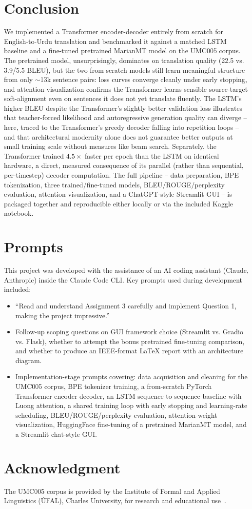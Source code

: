 \documentclass[conference]{IEEEtran}
\begin{document}
\section{Conclusion}
We implemented a Transformer encoder-decoder entirely from scratch for
English-to-Urdu translation and benchmarked it against a matched LSTM
baseline and a fine-tuned pretrained MarianMT model on the UMC005 corpus.
The pretrained model, unsurprisingly, dominates on translation quality
(22.5 vs. 3.9/5.5 BLEU), but the two from-scratch models still learn
meaningful structure from only $\sim$13k sentence pairs: loss curves
converge cleanly under early stopping, and attention visualization confirms
the Transformer learns sensible source-target soft-alignment even on
sentences it does not yet translate fluently. The LSTM's higher BLEU
despite the Transformer's slightly better validation loss illustrates that
teacher-forced likelihood and autoregressive generation quality can
diverge -- here, traced to the Transformer's greedy decoder falling into
repetition loops -- and that architectural modernity alone does not
guarantee better outputs at small training scale without measures like beam
search. Separately, the Transformer trained $4.5\times$ faster per epoch
than the LSTM on identical hardware, a direct, measured consequence of its
parallel (rather than sequential, per-timestep) decoder computation. The
full pipeline -- data preparation, BPE tokenization, three trained/fine-tuned
models, BLEU/ROUGE/perplexity evaluation, attention visualization, and a
ChatGPT-style Streamlit GUI -- is packaged together and reproducible either
locally or via the included Kaggle notebook.

\section{Prompts}
This project was developed with the assistance of an AI coding assistant
(Claude, Anthropic) inside the Claude Code CLI. Key prompts used during
development included:
\begin{itemize}
    \item ``Read and understand Assignment 3 carefully and implement Question 1, making the project impressive.''
    \item Follow-up scoping questions on GUI framework choice (Streamlit vs. Gradio vs. Flask), whether to attempt the bonus pretrained fine-tuning comparison, and whether to produce an IEEE-format LaTeX report with an architecture diagram.
    \item Implementation-stage prompts covering: data acquisition and cleaning for the UMC005 corpus, BPE tokenizer training, a from-scratch PyTorch Transformer encoder-decoder, an LSTM sequence-to-sequence baseline with Luong attention, a shared training loop with early stopping and learning-rate scheduling, BLEU/ROUGE/perplexity evaluation, attention-weight visualization, HuggingFace fine-tuning of a pretrained MarianMT model, and a Streamlit chat-style GUI.
\end{itemize}

\section*{Acknowledgment}
The UMC005 corpus is provided by the Institute of Formal and Applied
Linguistics (\'{U}FAL), Charles University, for research and educational
use~\cite{umc005}.



\end{document}
